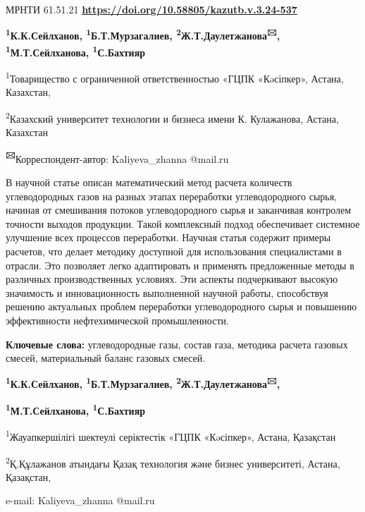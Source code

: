 \newpage
МРНТИ 61.51.21
\hfill {\bfseries \href{https://doi.org/10.58805/kazutb.v.3.24-537}{https://doi.org/10.58805/kazutb.v.3.24-537}}


\begin{center}
{\bfseries \textsuperscript{1}К.К.Сейлханов,
\textsuperscript{1}Б.Т.Мурзагалиев,
\textsuperscript{2}Ж.Т.Даулетжанова\textsuperscript{🖂}, \textsuperscript{1}М.Т.Сейлханова, \textsuperscript{1}С.Бахтияр}

\textsuperscript{1}Товарищество с ограниченной ответственностью «ГЦПК
«Кəсіпкер», Астана, Казахстан,

\textsuperscript{2}Казахский университет технологии и бизнеса имени К.
Кулажанова, Астана, Казахстан

{\bfseries \textsuperscript{🖂}}Корреспондент-автор: Kaliyeva\_zhanna
@mail.ru
\end{center}

В научной статье описан математический метод расчета количеств
углеводородных газов на разных этапах переработки углеводородного сырья,
начиная от смешивания потоков углеводородного сырья и заканчивая
контролем точности выходов продукции. Такой комплексный подход
обеспечивает системное улучшение всех процессов переработки. Научная
статья содержит примеры расчетов, что делает методику доступной для
использования специалистами в отрасли. Это позволяет легко адаптировать
и применять предложенные методы в различных производственных условиях.
Эти аспекты подчеркивают высокую значимость и инновационность
выполненной научной работы, способствуя решению актуальных проблем
переработки углеводородного сырья и повышению эффективности
нефтехимической промышленности.

{\bfseries Ключевые слова:} углеводородные газы, состав газа, методика
расчета газовых смесей, материальный баланс газовых смесей.


\begin{center}
{\bfseries \textsuperscript{1}К.К.Сейлханов,
\textsuperscript{1}Б.Т.Мурзагалиев,
\textsuperscript{2}Ж.Т.Даулетжанова\textsuperscript{🖂},}

{\bfseries \textsuperscript{1}М.Т.Сейлханова, \textsuperscript{1}С.Бахтияр}

\textsuperscript{1}Жауапкершілігі шектеулі серіктестік «ГЦПК «Кəсіпкер»,
Астана, Қазақстан

\textsuperscript{2}Қ.Құлажанов атындағы Қазақ технология және бизнес
университеті, Астана, Қазақстан,

e-mail: Kaliyeva\_zhanna @mail.ru
\end{center}

